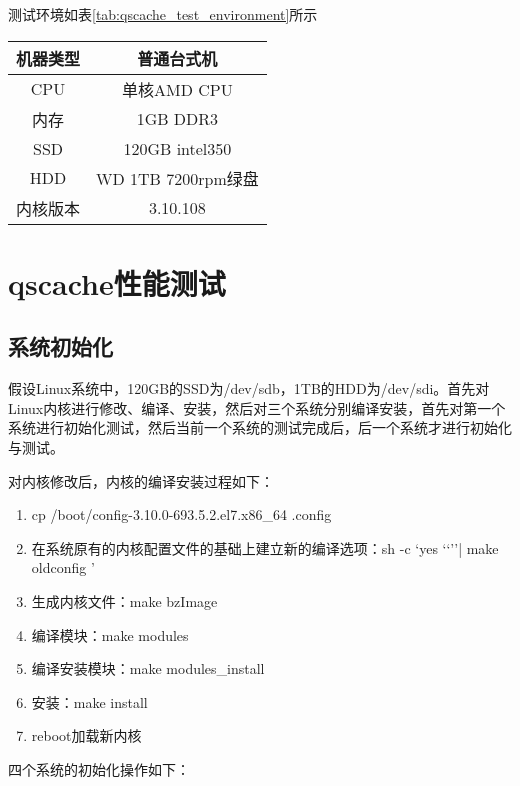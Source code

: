 测试环境如表\ref{tab:qscache_test_environment}所示

\begin{table}[H]
    \centering
    \begin{tabular}{cc} \toprule
      机器类型 & 普通台式机 \\ \midrule
      CPU & 单核AMD CPU\\
      内存 & 1GB DDR3\\
      SSD & 120GB intel350 \\
      HDD & WD 1TB 7200rpm绿盘\\
      内核版本 & 3.10.108\\
      \bottomrule
    \end{tabular}
\end{table}

\section{qscache性能测试}

\subsection{系统初始化}

假设Linux系统中，120GB的SSD为/dev/sdb，1TB的HDD为/dev/sdi。首先对Linux内核进行修改、编译、安装，然后对三个系统分别编译安装，首先对第一个系统进行初始化测试，然后当前一个系统的测试完成后，后一个系统才进行初始化与测试。

对内核修改后，内核的编译安装过程如下：

\begin{enumerate}
    \item cp /boot/config-3.10.0-693.5.2.el7.x86\_64 .config
    \item 在系统原有的内核配置文件的基础上建立新的编译选项：sh -c \lq yes \lq\lq\rq\rq | make oldconfig \rq
    \item 生成内核文件：make bzImage
    \item 编译模块：make modules
    \item 编译安装模块：make modules\_install
    \item 安装：make install
    \item reboot加载新内核
\end{enumerate}

四个系统的初始化操作如下：

